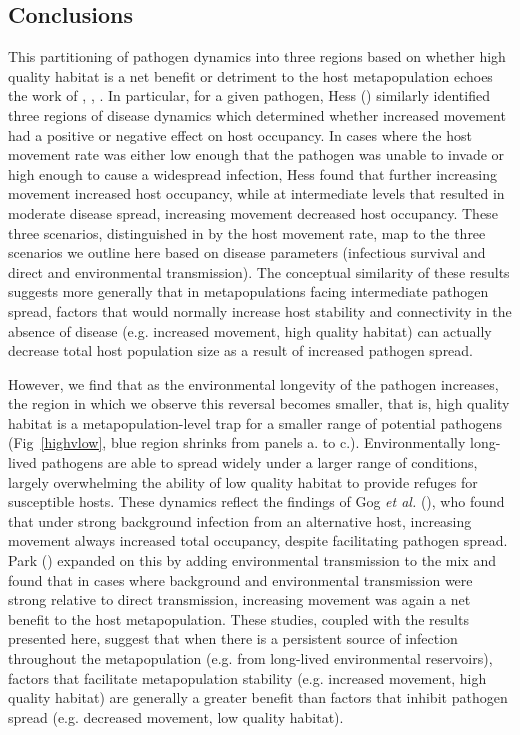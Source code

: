 \documentclass{article}
\begin{document}
\subsection*{Conclusions}  

This partitioning of pathogen dynamics into three regions based on whether high quality habitat is a net benefit or detriment to the host metapopulation echoes the work of \cite{Hess1996}, \cite{Gog2002}, \cite{Park2012}.
In particular, for a given pathogen, Hess (\cite{Hess1996}) similarly identified three regions of disease dynamics which determined whether increased movement had a positive or negative effect on host occupancy.  
In cases where the host movement rate was either low enough that the pathogen was unable to invade or high enough to cause a widespread infection, Hess found that further increasing movement increased host occupancy, while at intermediate levels that resulted in moderate disease spread, increasing movement decreased host occupancy.
These three scenarios, distinguished in \cite{Hess1996} by the host movement rate, map to the three scenarios we outline here based on disease parameters (infectious survival and direct and environmental transmission).
The conceptual similarity of these results suggests more generally that in metapopulations facing intermediate pathogen spread, factors that would normally increase host stability and connectivity in the absence of disease (e.g. increased movement, high quality habitat) can actually decrease total host population size as a result of increased pathogen spread.

However, we find that as the environmental longevity of the pathogen increases, the region in which we observe this reversal becomes smaller, that is, high quality habitat is a metapopulation-level trap for a smaller range of potential pathogens (Fig~\ref{highvlow}, blue region shrinks from panels a. to c.).  
Environmentally long-lived pathogens are able to spread widely under a larger range of conditions, largely overwhelming the ability of low quality habitat to provide refuges for susceptible hosts. 
These dynamics reflect the findings of Gog \emph{et al.} (\cite{Gog2002}), who found that under strong background infection from an alternative host, increasing movement always increased total occupancy, despite facilitating pathogen spread.  
Park (\cite{Park2012}) expanded on this by adding environmental transmission to the mix and found that in cases where background and environmental transmission were strong relative to direct transmission, increasing movement was again a net benefit to the host metapopulation.  
These studies, coupled with the results presented here, suggest that when there is a persistent source of infection throughout the metapopulation (e.g. from long-lived environmental reservoirs), factors that facilitate metapopulation stability (e.g. increased movement, high quality habitat) are generally a greater benefit than factors that inhibit pathogen spread (e.g. decreased movement, low quality habitat). 
\end{document}
